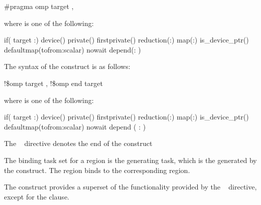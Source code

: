 {{\begin{boxedcode}
\#pragma omp target \plc{[clause[ [},\plc{] clause] ... ] new-line}
\end{boxedcode}

where  is one of the following:

\begin{indentedcodelist}
if(\plc{[} target :\plc{] scalar-expression})
device()
private()
firstprivate()
reduction(:)
map(\plc{[[map-type-modifier[,]] map-type}:\plc{ ] list})
is\_device\_ptr()
defaultmap(tofrom:scalar)
nowait
depend(: )
\end{indentedcodelist}
\ccppspecificend

\begin{samepage}
\smallskip
\fortranspecificstart
The syntax of the  construct is as follows:

\begin{boxedcode}
!\$omp target \plc{[clause[ [},\plc{] clause] ... ]}
!\$omp end target
\end{boxedcode}
\end{samepage}

\begin{samepage}
where  is one of the following:

\begin{indentedcodelist}
if(\plc{[} target :\plc{] scalar-logical-expression})
device()
private()
firstprivate()
reduction(:)
map(\plc{[[map-type-modifier[,]] map-type}:\plc{ ] list})
is\_device\_ptr()
defaultmap(tofrom:scalar)
nowait
depend ( : )
\end{indentedcodelist}
\end{samepage}

The ~ directive denotes the end of the  construct
\fortranspecificend

\binding
The binding task set for a  region is the
generating task, which is the  generated
by the  construct. The 
region binds to the corresponding  region.

\descr
The  construct provides a superset of the functionality
provided by the ~ directive, except for 
the  clause.

}}
